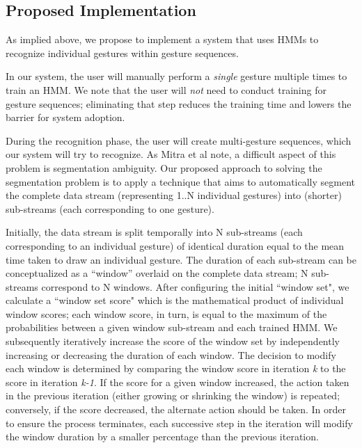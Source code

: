 \documentclass[twoside]{article}
\begin{document}
\begin{multicols}{2}

\section{Proposed Implementation}

As implied above, we propose to implement a system that uses HMMs 
to recognize individual gestures within gesture sequences.

In our system, the user will manually perform a \emph{single} gesture multiple times to train an HMM. We note that the user will \emph{not} need to conduct training for
gesture sequences; eliminating that step reduces the training time and lowers
the barrier for system adoption.

During the recognition phase, the user will create multi-gesture sequences, which our system will try to recognize. As Mitra et al note, 
a difficult aspect of this problem is segmentation ambiguity. Our proposed approach to solving the segmentation problem is to apply a technique that aims to automatically segment the complete data stream (representing 1..N individual gestures) into (shorter) sub-streams (each corresponding to one gesture).

Initially, the data stream is split temporally into N sub-streams 
(each corresponding to an individual gesture) of identical duration equal to the 
mean time taken to draw an individual gesture.
The duration of each sub-stream can be conceptualized as a ``window'' overlaid
on the complete data stream; N sub-streams correspond to N windows. After
configuring the initial ``window set", we calculate a ``window set score" which is the mathematical product of individual window scores; each window score, in turn, 
is equal to the maximum of the probabilities between a given window sub-stream 
and each trained HMM. We subsequently iteratively increase the score of the window set 
by independently increasing or decreasing the duration of each window. The decision to modify each window is determined by comparing the window score in iteration \emph{k} to the score in iteration \emph{k-1}. If the score for a given window increased, the action taken in the previous iteration (either growing or shrinking the window) is repeated; conversely, if the score decreased, the alternate action should be taken. In order to ensure the process terminates, each successive step in the iteration will modify the window duration by a smaller percentage than the previous iteration.


\end{multicols}
\end{document}
